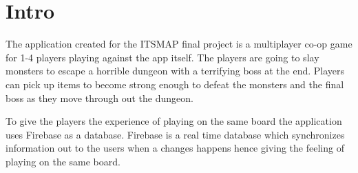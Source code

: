 \pagestyle{Uni}

\chapter{Intro}
The application created for the ITSMAP final project is a multiplayer co-op game for 1-4 players playing against the app itself. The players are going to slay monsters to escape a horrible dungeon with a terrifying boss at the end. Players can pick up items to  become strong enough to defeat the monsters and the final boss as they move through out the dungeon.

To give the players the experience of playing on the same board the application uses Firebase as a database. Firebase is a real time database which synchronizes information out to the users when a changes happens hence giving the feeling of playing on the same board.

